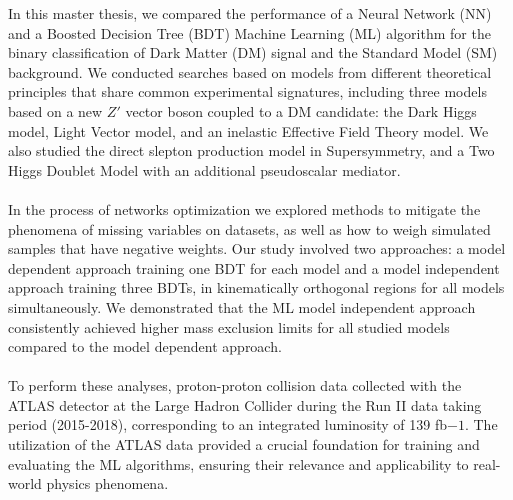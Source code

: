 \documentclass[12pt, a4paper]{book}
\begin{document}
In this master thesis, we compared the performance of a Neural Network (NN) and a Boosted Decision Tree (BDT) Machine Learning (ML) algorithm for the binary classification of Dark Matter (DM) signal and the Standard Model (SM) background. We conducted searches based on models from different theoretical principles that share common experimental signatures, 
including three models based on a new $Z'$ vector boson coupled to a DM candidate: the Dark Higgs model, Light Vector model, and an inelastic Effective Field Theory model. We also studied the direct slepton production model in Supersymmetry, and a Two Higgs Doublet Model with an additional pseudoscalar mediator. \\
\\In the process of networks optimization we explored methods to mitigate the phenomena of missing variables on datasets, as well as how to weigh simulated samples that have negative weights. Our study involved two approaches: a model dependent 
approach training one BDT for each model and a model independent approach training three BDTs, in kinematically orthogonal regions for all models simultaneously. We demonstrated that the ML model independent approach consistently achieved higher mass exclusion limits for all studied models compared to the model dependent approach. \\
\\To perform these analyses, proton-proton collision data collected with the ATLAS detector at the Large Hadron Collider during the Run II data taking period (2015-2018), corresponding to an integrated luminosity of 139 fb${-1}$. The utilization of the ATLAS data provided a crucial foundation for training and evaluating the ML algorithms, 
ensuring their relevance and applicability to real-world physics phenomena.

\end{document}
